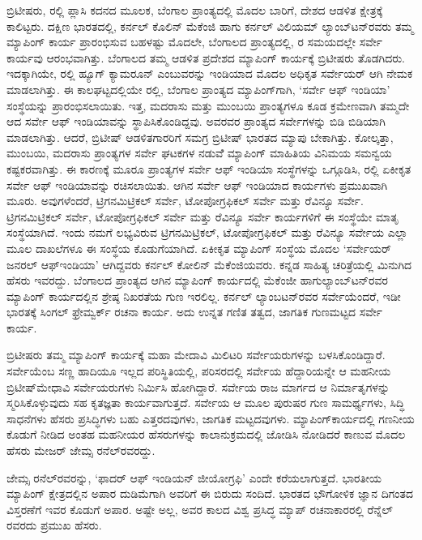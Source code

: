 ಬ್ರಿಟೀಷರು,  ರಲ್ಲಿ ಪ್ಲಾಸಿ ಕದನದ ಮೂಲಕ, ಬೆಂಗಾಲ ಪ್ರಾಂತ್ಯದಲ್ಲಿ ಮೊದಲ ಬಾರಿಗೆ, ದೇಶದ ಆಡಳಿತ ಕ್ಷೇತ್ರಕ್ಕೆ ಕಾಲಿಟ್ಟರು. ದಕ್ಷಿಣ ಭಾರತದಲ್ಲಿ, ಕರ್ನಲ್​ ಕೊಲಿನ್​ ಮೆಕೆಂಜಿ ಹಾಗು ಕರ್ನಲ್​ ವಿಲಿಯಮ್ ಲ್ಯಾಂಬ್​ಟನ್​ರವರು ತಮ್ಮ ಮ್ಯಾಪಿಂಗ್​ ಕಾರ್ಯ ಪ್ರಾರಂಭಿಸುವ ಬಹಳಷ್ಟು ಮೊದಲೇ, ಬೆಂಗಾಲದ ಪ್ರಾಂತ್ಯದಲ್ಲಿ, ರ ಸಮಯದಲ್ಲೇ ಸರ್ವೇ ಕಾರ್ಯವು ಆರಂಭವಾಗಿತ್ತು. ಬೆಂಗಾಲದ ತಮ್ಮ ಆಡಳಿತ ಪ್ರದೇಶದ ಮ್ಯಾಪಿಂಗ್​ ಕಾರ್ಯಕ್ಕೆ ಬ್ರಿಟೀಷರು ತೊಡಗಿದರು. ಇದಕ್ಕಾಗಿಯೇ, ರಲ್ಲಿ ಹ್ಯೂಗ್​ ಕ್ಯಾಮರೂನ್​ ಎಂಬುವರನ್ನು ಇಂಡಿಯಾದ ಮೊದಲ ಅಧಿಕೃತ ಸರ್ವೇಯರ್​ ಆಗಿ ನೇಮಕ ಮಾಡಲಾಗಿತ್ತು. ಈ ಕಾಲಘಟ್ಟದಲ್ಲಿಯೇ ರಲ್ಲಿ, ಬೆಂಗಾಲ ಪ್ರಾಂತ್ಯದ ಮ್ಯಾಪಿಂಗ್​ಗಾಗಿ, ‘ಸರ್ವೇ ಆಫ್​ ಇಂಡಿಯಾ’ ಸಂಸ್ಥೆಯನ್ನು ಪ್ರಾರಂಭಿಸಲಾಯಿತು. ಇತ್ತ, ಮದರಾಸು ಮತ್ತು ಮುಂಬಯಿ ಪ್ರಾಂತ್ಯಗಳೂ ಕೂಡ ಕ್ರಮೇಣವಾಗಿ ತಮ್ಮದೇ ಆದ ಸರ್ವೇ ಆಫ್​ ಇಂಡಿಯಾವನ್ನು ಸ್ಥಾಪಿಸಿಕೊಂಡಿದ್ದವು. ಅವರವರ ಪ್ರಾಂತ್ಯದ ಸರ್ವೇಗಳನ್ನು ಬಿಡಿ ಬಿಡಿಯಾಗಿ ಮಾಡಲಾಗಿತ್ತು. ಆದರೆ, ಬ್ರಿಟೀಷ್​ ಆಡಳಿತಗಾರರಿಗೆ ಸಮಗ್ರ ಬ್ರಿಟೀಷ್​ ಭಾರತದ ಮ್ಯಾಪು ಬೇಕಾಗಿತ್ತು. ಕೋಲ್ಕತ್ತಾ, ಮುಂಬಯಿ, ಮದರಾಸು ಪ್ರಾಂತ್ಯಗಳ ಸರ್ವೇ ಘಟಕಗಳ ನಡುವೆೆ ಮ್ಯಾಪಿಂಗ್​ ಮಾಹಿತಿಯ ವಿನಿಮಯ ಸಮನ್ವಯ ಕಷ್ಟಕರವಾಗಿತ್ತು. ಈ ಕಾರಣಕ್ಕೆ ಮೂರೂ ಪ್ರಾಂತ್ಯಗಳ ಸರ್ವೇ ಆಫ್​ ಇಂಡಿಯಾ ಸಂಸ್ಥೆಗಳನ್ನು ಒಗ್ಗೂಡಿಸಿ, ರಲ್ಲಿ ಏಕೀಕೃತ ಸರ್ವೇ ಆಫ್​ ಇಂಡಿಯಾವನ್ನು ರಚಿಸಲಾಯಿತು. ಆಗಿನ ಸರ್ವೇ ಆಫ್​ ಇಂಡಿಯಾದ ಕಾರ್ಯಗಳು ಪ್ರಮುಖವಾಗಿ ಮೂರು. ಅವುಗಳೆಂದರೆ, ಟ್ರಿಗನಮಿಟ್ರಿಕಲ್​ ಸರ್ವೇ, ಟೋಪೋಗ್ರಫಿಕಲ್​ ಸರ್ವೇ ಮತ್ತು ರೆವಿನ್ಯೂ ಸರ್ವೇ. ಟ್ರಿಗನಮಿಟ್ರಿಕಲ್​ ಸರ್ವೇ, ಟೋಪೋಗ್ರಫಿಕಲ್​ ಸರ್ವೇ ಮತ್ತು ರೆವಿನ್ಯೂ ಸರ್ವೇ ಕಾರ್ಯಗಳಿಗೆ ಈ ಸಂಸ್ಥೆಯೇ ಮಾತೃ ಸಂಸ್ಥೆಯಾಗಿದೆ. ಇಂದು ನಮಗೆ ಲಭ್ಯವಿರುವ ಟ್ರಿಗನಮಿಟ್ರಿಕಲ್​, ಟೋಪೋಗ್ರಫಿಕಲ್​ ಮತ್ತು ರೆವಿನ್ಯೂ ಸರ್ವೇಯ ಎಲ್ಲಾ ಮೂಲ ದಾಖಲೆಗಳೂ ಈ ಸಂಸ್ಥೆಯ ಕೊಡುಗೆಯಾಗಿದೆ. ಏಕೀಕೃತ ಮ್ಯಾಪಿಂಗ್​ ಸಂಸ್ಥೆಯ ಮೊದಲ ‘ಸರ್ವೇಯರ್​ ಜನರಲ್​ ಆಫ್​ ಇಂಡಿಯಾ’ ಆಗಿದ್ದವರು ಕರ್ನಲ್​ ಕೋಲಿನ್​ ಮೆಕೆಂಜಿಯವರು. ಕನ್ನಡ ಸಾಹಿತ್ಯ ಚರಿತ್ರೆಯಲ್ಲಿ ಮಿನುಗಿದ ಹೆಸರು ಇವರದ್ದು. ಬೆಂಗಾಲದ ಪ್ರಾಂತ್ಯದ ಆಗಿನ ಮ್ಯಾಪಿಂಗ್​ ಕಾರ್ಯದಲ್ಲಿ ಮೆಕೆಂಜೀ ಹಾಗು\break ಲ್ಯಾಂಬ್​ಟನ್​ರವರ ಮ್ಯಾಪಿಂಗ್​ ಕಾರ್ಯದಲ್ಲಿನ ಶ್ರೇಷ್ಠ ನಿಖರತೆಯ ಗುಣ ಇರಲಿಲ್ಲ. ಕರ್ನಲ್​ ಲ್ಯಾಂಬಟನ್​ರವರ ಸರ್ವೇಯೆಂದರೆ, ಇಡೀ ಭಾರತಕ್ಕೆ ಸಿಂಗಲ್​ ಫ್ರೇಮ್ವರ್ಕ್ ರಚನಾ ಕಾರ್ಯ. ಅದು ಉನ್ನತ ಗಣಿತ ತತ್ವದ, ಜಾಗತಿಕ ಗುಣಮಟ್ಟದ ಸರ್ವೇ ಕಾರ್ಯ.

ಬ್ರಿಟೀಷರು ತಮ್ಮ ಮ್ಯಾಪಿಂಗ್​ ಕಾರ್ಯಕ್ಕೆ ಮಹಾ ಮೇದಾವಿ ಮಿಲಿಟರಿ ಸರ್ವೇಯರುಗಳನ್ನು ಬಳಸಿಕೊಂಡಿದ್ದಾರೆ. ಸರ್ವೇಯೆಂಬ ಸಣ್ಣ ಹಾದಿಯೂ ಇಲ್ಲದ ಪರಿಸ್ಥಿತಿಯಲ್ಲಿ, ಪರಿಸರದಲ್ಲಿ ಸರ್ವೇಯ ಹೆದ್ದಾರಿಯನ್ನೇ ಆ ಮಹನೀಯ ಬ್ರಿಟೀಷ್​ ಮೇಧಾವಿ ಸರ್ವೇಯರುಗಳು ನಿರ್ಮಿಸಿ ಹೋಗಿದ್ದಾರೆ. ಸರ್ವೇಯ ರಾಜ ಮಾರ್ಗದ ಆ ನಿರ್ಮಾತೃಗಳನ್ನು ಸ್ಮರಿಸಿಕೊಳ್ಳುವುದು ಸಹ ಕೃತಜ್ಞತಾ ಕಾರ್ಯವಾಗುತ್ತದೆ. ಸರ್ವೇಯ ಆ ಮೂಲ ಪುರುಷರ ಗುಣ ಸಾಮರ್ಥ್ಯಗಳು, ಸಿದ್ಧಿ ಸಾಧನೆಗಳು ಹೆಸರು ಪ್ರಸಿದ್ಧಿಗಳು ಬಹು ಎತ್ತರದವುಗಳು, ಜಾಗತಿಕ ಮಟ್ಟದವುಗಳು. ಮ್ಯಾಪಿಂಗ್​ ಕಾರ್ಯದಲ್ಲಿ ಗಣನೀಯ ಕೊಡುಗೆ ನೀಡಿದ ಅಂತಹ ಮಹನೀಯರ ಹೆಸರುಗಳನ್ನು ಕಾಲಾನುಕ್ರಮದಲ್ಲಿ ಜೋಡಿಸಿ ನೋಡಿದರೆ ಕಾಣುವ ಮೊದಲ ಹೆಸರು ಮೇಜರ್​ ಜೇಮ್ಸ ರನೆಲ್​ರವರದ್ದು.

ಜೇಮ್ಸ ರನೆಲ್​ರವರನ್ನು, ‘ಫಾದರ್​ ಆಫ್​ ಇಂಡಿಯನ್​ ಜೀಯೋಗ್ರಫಿ’ ಎಂದೇ ಕರೆಯಲಾಗುತ್ತದೆ. ಭಾರತೀಯ ಮ್ಯಾಪಿಂಗ್​ ಕ್ಷೇತ್ರದಲ್ಲಿನ ಅಪಾರ ದುಡಿಮೆಗಾಗಿ ಅವರಿಗೆ ಈ ಬಿರುದು ಸಂದಿದೆ. ಭಾರತದ ಭೌಗೋಳಿಕ ಜ್ಞಾನ ದಿಗಂತದ ವಿಸ್ತರಣೆಗೆ ಇವರ ಕೊಡುಗೆ ಅಪಾರ. ಅಷ್ಟೇ ಅಲ್ಲ, ಅವರ ಕಾಲದ ವಿಶ್ವ ಪ್ರಸಿದ್ಧ ಮ್ಯಾಪ್​ ರಚನಾಕಾರರಲ್ಲಿ ರೆನ್ನೆಲ್​ರವರದು ಪ್ರಮುಖ ಹೆಸರು.

